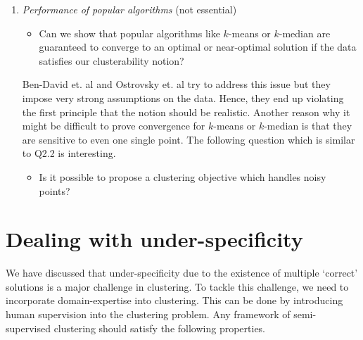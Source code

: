 \documentclass[letterpaper,12pt,titlepage,oneside,final]{book}
\begin{document}
\begin{enumerate}
\item \emph{Performance of popular algorithms }(not essential)
\begin{itemize}
\item Can we show that popular algorithms like $k$-means or $k$-median are guaranteed to converge to an optimal or near-optimal solution if the data satisfies our clusterability notion? 
\end{itemize}
Ben-David et. al \cite{ben2014clustering} and Ostrovsky et. al \cite{ostrovsky2006effectiveness} try to address this issue but they impose very strong assumptions on the data. Hence, they end up violating the first principle that the notion should be realistic. Another reason why it might be difficult to prove convergence for $k$-means or $k$-median is that they are sensitive to even one single point. The following question which is similar to Q2.2 is interesting.
\begin{itemize}
\item Is it possible to propose a clustering objective which handles noisy points?
\end{itemize}

\end{enumerate}


\section{Dealing with under-specificity}
We have discussed that under-specificity due to the existence of multiple `correct' solutions is a major challenge in clustering. To tackle this challenge, we need to incorporate domain-expertise into clustering. This can be done by introducing human supervision into the clustering problem. Any framework of semi-supervised clustering should satisfy the following properties.
\end{document}
